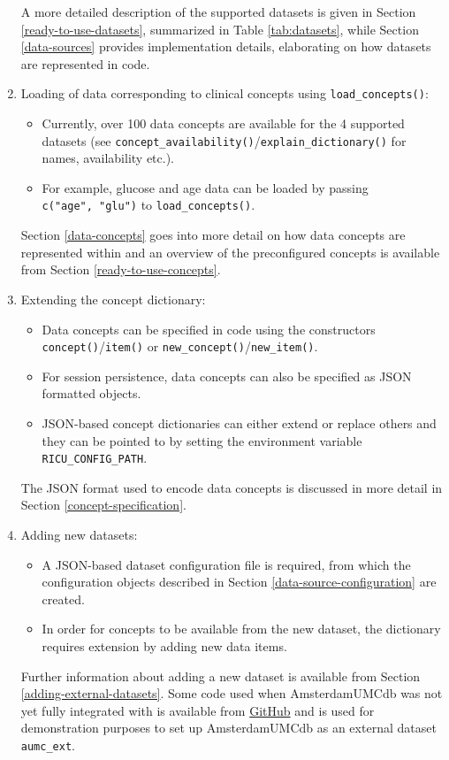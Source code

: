 \documentclass[
  notitle,
  nojss,
  noheadings]{jss}
\begin{document}
\begin{enumerate}
  A more detailed description of the supported datasets is given in
  Section \ref{ready-to-use-datasets}, summarized in Table
  \ref{tab:datasets}, while Section \ref{data-sources} provides
  implementation details, elaborating on how datasets are represented in
  code.
\item
  Loading of data corresponding to clinical concepts using
  \texttt{load\_concepts()}:

  \begin{itemize}
  \item
    Currently, over 100 data concepts are available for the 4 supported
    datasets (see
    \texttt{concept\_availability()}/\texttt{explain\_dictionary()} for
    names, availability etc.).
  \item
    For example, glucose and age data can be loaded by passing
    \texttt{c("age",\ "glu")} to \texttt{load\_concepts()}.
  \end{itemize}

  Section \ref{data-concepts} goes into more detail on how data concepts
  are represented within  and an overview of the preconfigured
  concepts is available from Section \ref{ready-to-use-concepts}.
\item
  Extending the concept dictionary:

  \begin{itemize}
  \item
    Data concepts can be specified in code using the constructors
    \texttt{concept()}/\texttt{item()} or
    \texttt{new\_concept()}/\texttt{new\_item()}.
  \item
    For session persistence, data concepts can also be specified as JSON
    formatted objects.
  \item
    JSON-based concept dictionaries can either extend or replace others
    and they can be pointed to by setting the environment variable
    \texttt{RICU\_CONFIG\_PATH}.
  \end{itemize}

  The JSON format used to encode data concepts is discussed in more
  detail in Section \ref{concept-specification}.
\item
  Adding new datasets:

  \begin{itemize}
  \item
    A JSON-based dataset configuration file is required, from which the
    configuration objects described in Section
    \ref{data-source-configuration} are created.
  \item
    In order for concepts to be available from the new dataset, the
    dictionary requires extension by adding new data items.
  \end{itemize}

  Further information about adding a new dataset is available from
  Section \ref{adding-external-datasets}. Some code used when
  AmsterdamUMCdb was not yet fully integrated with  is
  available from \href{https://github.com/eth-mds/aumc}{GitHub} and is
  used for demonstration purposes to set up AmsterdamUMCdb as an
  external dataset \texttt{aumc\_ext}.
\end{enumerate}
\end{document}
